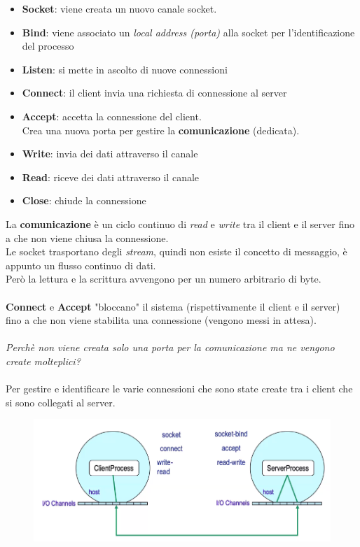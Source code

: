 \documentclass[12pt, a4paper]{article}
\begin{document}
    \begin{itemize}
        \item \textbf{Socket}: viene creata un nuovo canale socket.
        \item \textbf{Bind}: viene associato un \textit{local address (porta)} alla socket per l'identificazione del processo
        \item \textbf{Listen}: si mette in ascolto di nuove connessioni
        \item \textbf{Connect}: il client invia una richiesta di connessione al server
        \item \textbf{Accept}: accetta la connessione del client.
        \\Crea una nuova porta per gestire la \textbf{comunicazione} (dedicata). 
        \item \textbf{Write}: invia dei dati attraverso il canale
        \item \textbf{Read}: riceve dei dati attraverso il canale
        \item \textbf{Close}: chiude la connessione
    \end{itemize}
    La \textbf{comunicazione} è un ciclo continuo di \textit{read} e \textit{write}
    tra il client e il server fino a che non viene chiusa la connessione.
    \\Le socket trasportano degli \textit{stream}, quindi non esiste il concetto di messaggio,
    è appunto un flusso continuo di dati.
    \\Però la lettura e la scrittura avvengono per un numero arbitrario di byte.
    \\\\
    \textbf{Connect} e \textbf{Accept} "bloccano" il sistema (rispettivamente il client e il server)
     fino a che non viene stabilita una connessione (vengono messi in attesa).
    \\\\
    \newpage
    \textit{Perchè non viene creata solo una porta per la comunicazione ma ne vengono create molteplici?}
    \\\\Per gestire e identificare le varie connessioni che sono state create tra i client che si sono collegati al server.

    \begin{figure}[htbp]
        \centering
        \includegraphics[scale=0.6]{socketsteps2.png}
    \end{figure}
\end{document}
